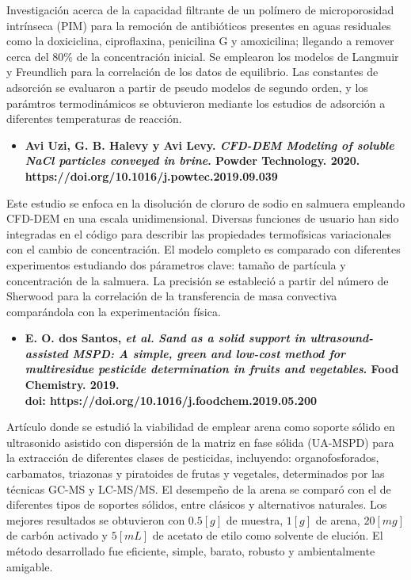 Investigaci\'on acerca de la capacidad filtrante de un pol\'imero de microporosidad intr\'inseca (PIM) para la remoci\'on de antibi\'oticos presentes en aguas residuales como la doxiciclina, ciproflaxina, penicilina G y amoxicilina; llegando a remover cerca del $80\%$ de la concentraci\'on inicial. Se emplearon los modelos de Langmuir y Freundlich para la correlaci\'on de los datos de equilibrio. Las constantes de adsorci\'on se evaluaron a partir de pseudo modelos de segundo orden, y los par\'amtros termodin\'amicos se obtuvieron mediante los estudios de adsorci\'on a diferentes temperaturas de reacci\'on.

\begin{itemize}
	\item{\textbf{Avi Uzi, G. B. Halevy y Avi Levy. \textit{CFD-DEM Modeling of soluble NaCl particles conveyed in brine}. Powder Technology. 2020. \\https://doi.org/10.1016/j.powtec.2019.09.039}}
\end{itemize}

\noindent
\justify

Este estudio se enfoca en la disoluci\'on de cloruro de sodio en salmuera empleando CFD-DEM en una escala unidimensional. Diversas funciones de usuario han sido integradas en el c\'odigo para describir las propiedades termof\'isicas variacionales con el cambio de concentraci\'on. El modelo completo es comparado con diferentes experimentos estudiando dos p\'arametros clave: tama\~no de part\'icula y concentraci\'on de la salmuera. La precisi\'on se estableci\'o a partir del n\'umero de Sherwood para la correlaci\'on de la transferencia de masa convectiva compar\'andola con la experimentaci\'on f\'isica.

\begin{itemize}
	\item{\textbf{E. O. dos Santos, \textit{et al.} \textit{Sand as a solid support in ultrasound-assisted MSPD: A simple, green and low-cost method for multiresidue pesticide determination in fruits and vegetables}. Food Chemistry. 2019. \\doi: https://doi.org/10.1016/j.foodchem.2019.05.200}}
\end{itemize}

\noindent
\justify

Art\'iculo donde se estudi\'o la viabilidad de emplear arena como soporte s\'olido en ultrasonido asistido con dispersi\'on de la matriz en fase s\'olida (UA-MSPD) para la extracci\'on de diferentes clases de pesticidas, incluyendo: organofosforados, carbamatos, triazonas y piratoides de frutas y vegetales, determinados por las t\'ecnicas GC-MS y LC-MS/MS. El desempe\~no de la arena se compar\'o con el de diferentes tipos de soportes s\'olidos, entre cl\'asicos y alternativos naturales. Los mejores resultados se obtuvieron con $0.5 [g]$ de muestra, $1 [g]$ de arena, $20 [mg]$ de carb\'on activado y $5 [mL]$ de acetato de etilo como solvente de eluci\'on.  El m\'etodo desarrollado fue eficiente, simple, barato, robusto y ambientalmente amigable.

